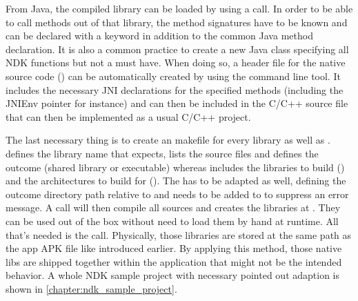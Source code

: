 From Java, the compiled library can be loaded by using a
 call. In order to be able to call methods out 
of that library, the method signatures have to be known and can be declared with 
a  keyword in addition to the common Java method declaration. It is also a 
common practice to create a new Java class specifying all NDK functions but not a must have. When doing so, a header file for the native source code () can be automatically
created by using the  command line tool. It includes the necessary JNI
declarations for the specified methods (including the JNIEnv pointer for instance)
and can then be included in the C/C++ source file that can then be implemented as a
usual C/C++ project.

The last necessary thing is to create an  makefile for every library as well as .  defines the library name that  expects, lists the source files and defines the outcome (shared library or executable) whereas  includes
the libraries to build () and the architectures to build for
(). The  has to be adapted as well, defining the
outcome directory path relative to  and  needs to be added to  to suppress an error message. 
A  call will then compile all sources and creates the libraries
at . They can be used out of the box without need to load them by hand
at runtime. All that's needed is the  call. Physically, those libraries are stored at the same path as the app APK file like introduced earlier. By applying this method, those native libs are shipped together within the application that might not be the intended behavior. A whole NDK sample project with necessary 
pointed out adaption is shown in \autoref{chapter:ndk_sample_project}.

